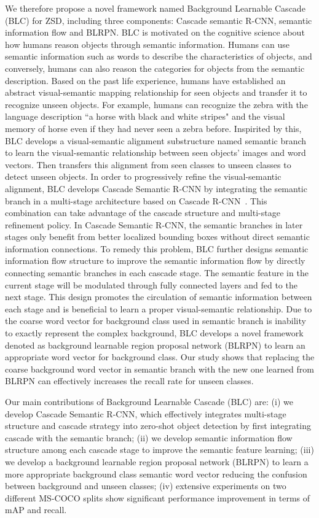 \documentclass[runningheads]{llncs}
\begin{document}
We therefore propose a novel framework named Background Learnable Cascade (BLC) for ZSD, including three components: Cascade semantic R-CNN, semantic information flow and BLRPN. BLC is motivated on the cognitive science about how humans reason objects through semantic information. Humans can use semantic information such as words to describe the characteristics of objects, and conversely, humans can also reason the categories for objects from the semantic description. Based on the past life experience, humans have established an abstract visual-semantic mapping relationship for seen objects and transfer it to recognize unseen objects. For example, humans can recognize the zebra with the language description ``a horse with black and white stripes" and the visual memory of horse even if they had never seen a zebra before. Inspirited by this, BLC develops a visual-semantic alignment substructure named semantic branch to learn the visual-semantic relationship between seen objects' images and word vectors. Then transfers this alignment from seen classes to unseen classes to detect unseen objects. In order to progressively refine the visual-semantic alignment, BLC develops Cascade Semantic R-CNN by integrating the semantic branch in a multi-stage architecture based on Cascade R-CNN~\cite{cascadercnn}. This combination can take advantage of the cascade structure and multi-stage refinement policy. In Cascade Semantic R-CNN, the semantic branches in later stages only benefit from better localized bounding boxes without direct semantic information connections. To remedy this problem, BLC further designs semantic information flow structure to improve the semantic information flow by directly connecting semantic branches in each cascade stage. The semantic feature in the current stage will be modulated through fully connected layers and fed to the next stage. This design promotes the circulation of semantic information between each stage and is beneficial to learn a proper visual-semantic relationship. Due to the coarse word vector for background class used in semantic branch is inability to exactly represent the complex background, BLC develops a novel framework denoted as background learnable region proposal network (BLRPN) to learn an appropriate word vector for background class. Our study shows that replacing the coarse background word vector in semantic branch with the new one learned from BLRPN can effectively increases the recall rate for unseen classes.

Our main contributions of Background Learnable Cascade (BLC) are: (i) we develop Cascade Semantic R-CNN, which effectively integrates multi-stage structure and cascade strategy into zero-shot object detection by first integrating cascade with the semantic branch; (ii) we develop semantic information flow structure among each cascade stage to improve the semantic feature learning; (iii) we develop a background learnable region proposal network (BLRPN) to learn a more appropriate background class semantic word vector reducing the confusion between background and unseen classes; (iv) extensive experiments on two different MS-COCO splits show significant performance improvement in terms of mAP and recall.
\end{document}
